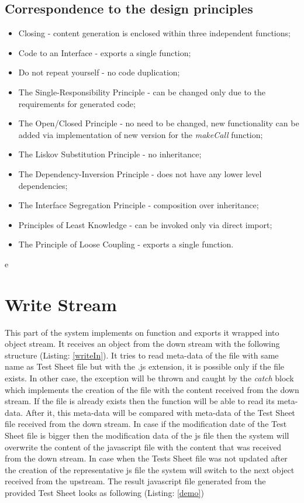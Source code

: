 {\subsection{Correspondence to the design principles}
\begin{itemize}
	\item Closing - content generation is enclosed within three independent functions;
	\item Code to an Interface - exports a single function;
	\item Do not repeat yourself - no code duplication;
	\item The Single-Responsibility Principle - can be changed only due to the requirements for generated code;
	\item The Open/Closed Principle - no need to be changed, new functionality can be added via implementation of new version for the \textit{makeCall} function;
	\item The Liskov Substitution Principle - no inheritance;
	\item The Dependency-Inversion Principle - does not have any lower level dependencies;
	\item The Interface Segregation Principle - composition over inheritance;
	\item Principles of Least Knowledge - can be invoked only via direct import;
	\item The Principle of Loose Coupling - exports a single function.
\end{itemize}

e\section{Write Stream}
\label{sec:write}
This part of the system implements on function and exports it wrapped into object stream. It receives an object from the down stream with the following structure (Listing: \ref{writeIn}). It tries to read meta-data of the file with same name as Test Sheet file but with the .js extension, it is possible only if the file exists. In other case, the exception will be thrown and caught by the \textit{ catch} block which implements the creation of the file with the content received from the down stream. If the file is already exists then the function will be able to read its meta-data. After it, this meta-data will be compared with meta-data of the Test Sheet file received from the down stream. In case if the modification date of the Test Sheet file is bigger then the modification data of the js file then the system will overwrite the content of the javascript file with the content that was received from the down stream. In case when the Tests Sheet file was not updated after the creation of the representative js file the system will switch to the next object received from the upstream. The result javascript file generated from the provided Test Sheet looks as following (Listing: \ref{demo})

}
